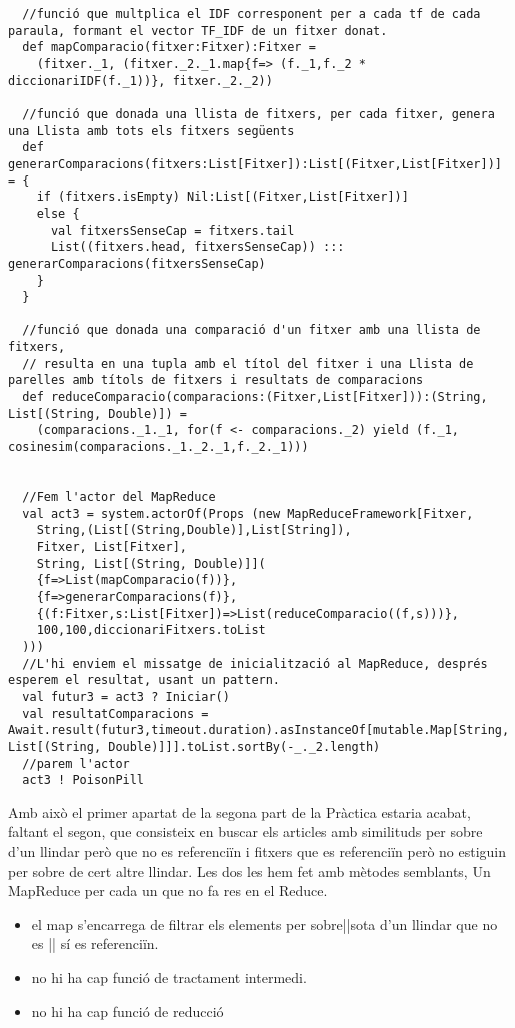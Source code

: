 \documentclass[11pt,a4paper,twoside]{report}
\begin{document}
\begin{lstlisting}
  //funció que multplica el IDF corresponent per a cada tf de cada paraula, formant el vector TF_IDF de un fitxer donat.
  def mapComparacio(fitxer:Fitxer):Fitxer =
    (fitxer._1, (fitxer._2._1.map{f=> (f._1,f._2 * diccionariIDF(f._1))}, fitxer._2._2))

  //funció que donada una llista de fitxers, per cada fitxer, genera una Llista amb tots els fitxers següents
  def generarComparacions(fitxers:List[Fitxer]):List[(Fitxer,List[Fitxer])] = {
    if (fitxers.isEmpty) Nil:List[(Fitxer,List[Fitxer])]
    else {
      val fitxersSenseCap = fitxers.tail
      List((fitxers.head, fitxersSenseCap)) ::: generarComparacions(fitxersSenseCap)
    }
  }

  //funció que donada una comparació d'un fitxer amb una llista de fitxers,
  // resulta en una tupla amb el títol del fitxer i una Llista de parelles amb títols de fitxers i resultats de comparacions
  def reduceComparacio(comparacions:(Fitxer,List[Fitxer])):(String, List[(String, Double)]) =
    (comparacions._1._1, for(f <- comparacions._2) yield (f._1, cosinesim(comparacions._1._2._1,f._2._1)))


  //Fem l'actor del MapReduce
  val act3 = system.actorOf(Props (new MapReduceFramework[Fitxer,
    String,(List[(String,Double)],List[String]),
    Fitxer, List[Fitxer],
    String, List[(String, Double)]](
    {f=>List(mapComparacio(f))},
    {f=>generarComparacions(f)},
    {(f:Fitxer,s:List[Fitxer])=>List(reduceComparacio((f,s)))},
    100,100,diccionariFitxers.toList
  )))
  //L'hi enviem el missatge de inicialització al MapReduce, després esperem el resultat, usant un pattern.
  val futur3 = act3 ? Iniciar()
  val resultatComparacions = Await.result(futur3,timeout.duration).asInstanceOf[mutable.Map[String, List[(String, Double)]]].toList.sortBy(-_._2.length)
  //parem l'actor
  act3 ! PoisonPill
\end{lstlisting}

Amb això el primer apartat de la segona part de la Pràctica estaria acabat, faltant el segon, que consisteix en buscar els articles amb similituds per sobre d'un llindar però que no es referenciïn
i fitxers que es referenciïn però no estiguin per sobre de cert altre llindar. Les dos les hem fet amb mètodes semblants, Un MapReduce per cada un que no fa res en el Reduce.
\begin{itemize}
  \item el map s'encarrega de filtrar els elements per {sobre||sota} d'un llindar que {no es || sí es} referenciïn.
  \item no hi ha cap funció de tractament intermedi.
  \item no hi ha cap funció de reducció
\end{itemize}
\end{document}
